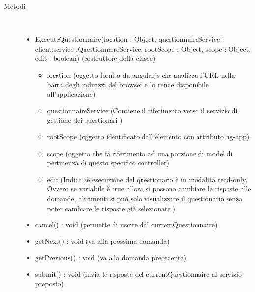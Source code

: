 \begin{description}
\item[Metodi] \hfill \\
 \vspace{-7mm}
\begin{itemize}
\item ExecuteQuestionnaire(location : Object, questionnaireService : client.service .QuestionnaireService, rootScope : Object, scope : Object, edit : boolean) (costruttore della classe)\begin{itemize}
\item location (oggetto fornito da angularjs che analizza l'URL nella barra degli indirizzi del browser e lo rende disponibile all'applicazione)
\item questionnaireService (Contiene il riferimento verso il servizio di gestione dei questionari )
\item rootScope (oggetto identificato dall’elemento con attributo ng-app)
\item scope (oggetto che fa riferimento ad una porzione di model di pertinenza di questo specifico controller)
\item edit (Indica se esecuzione del questionario è in modalità read-only. Ovvero se variabile è true allora si possono cambiare le risposte alle domande, altrimenti si può solo visualizzare il questionario senza poter cambiare le risposte già selezionate )
\end{itemize}

\item cancel() : void (permette di uscire dal currentQuestionnaire)
\item getNext() : void (va alla prossima domanda)
\item getPrevious() : void (va alla domanda precedente)
\item submit() : void (invia le risposte del currentQuestionnaire al servizio preposto)
\end{itemize}

\end{description}

